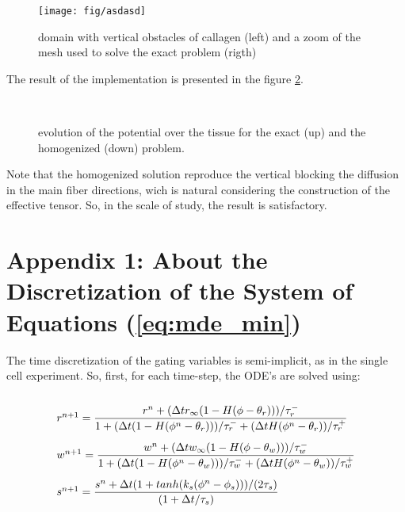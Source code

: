 \begin{figure}[H]
\begin{center}
\texttt{[image: fig/asdasd]}
\caption{ domain with vertical obstacles of callagen (left) and a zoom of the mesh used to solve the exact problem (rigth)} \label{fig:mde_min_exp2_mesh}
\end{center}
\end{figure}

The result of the implementation is presented in the figure \ref{fig:results_exp3}.

\begin{figure}[H]
\centering
{} \\
\caption{evolution of the potential over the tissue for the exact (up) and the homogenized (down) problem.} \label{fig:results_exp3}
\end{figure}


Note that the homogenized solution reproduce the vertical blocking the diffusion in the main fiber directions, wich is natural considering the construction of the effective tensor. So, in the scale of study, the result is satisfactory.

\newpage 
\section{Appendix 1: About the Discretization of the System of Equations (\ref{eq:mde_min})}

The time discretization of the gating variables is semi-implicit, as in the single cell experiment. So, first, for each time-step, the ODE's are solved using:


\begin{equation}
\arraycolsep=1.4pt\def\arraystretch{2.8}
\begin{array}{l}
r^{n+1} = \dfrac{r^n + (\Delta t r_{\infty}(1 - H(\phi - \theta_r)))/\tau_r^-}{1  +  (\Delta t (1 - H(\phi^n - \theta_r)))/\tau_r^- + (\Delta t H(\phi^n - \theta_r))/\tau_r^+} \\

w^{n+1} = \dfrac{w^n + (\Delta t w_{\infty}(1 - H(\phi - \theta_w)))/\tau_w^-}{1  +  (\Delta t (1 - H(\phi^n - \theta_w)))/\tau_w^- + (\Delta t H(\phi^n - \theta_w))/\tau_w^+} \\
   
s^{n+1} = \dfrac{s^n + \Delta t (1 + tanh(k_s (\phi^n - \phi_s)))/(2 \tau_s)}{(1 + \Delta t / \tau_s)}
\end{array} 
\end{equation}

